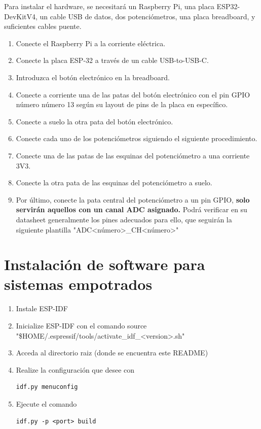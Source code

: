 \documentclass[12pt,a4paper,twoside,openright]{book}
\begin{document}
\begin{umaappendices}
Para instalar el hardware, se necesitará un Raspberry Pi, una placa ESP32-DevKitV4, un cable USB de datos, dos potenciómetros, una placa breadboard, y suficientes cables puente.
\begin{enumerate}
\item Conecte el Raspberry Pi a la corriente eléctrica.
\item Conecte la placa ESP-32 a través de un cable USB-to-USB-C.
\item Introduzca el botón electrónico en la breadboard.
\item Conecte a corriente una de las patas del botón electrónico con el pin GPIO número número 13 según su layout de pins de la placa en específico.
\item Conecte a suelo la otra pata del botón electrónico.
\item Conecte cada uno de los potenciómetros siguiendo el siguiente procedimiento.
\item[\textbullet] Conecte una de las patas de las esquinas del potenciómetro a una corriente 3V3.
\item[\textbullet] Conecte la otra pata de las esquinas del potenciómetro a suelo.
\item[\textbullet] Por último, conecte la pata central del potenciómetro a un pin GPIO, \textbf{solo servirán aquellos con un canal ADC asignado.} Podrá verificar en su datasheet generalmente los pines adecuados para ello, que seguirán la siguiente plantilla "ADC<número>\_CH<número>" 
\end{enumerate}

\section{Instalación de software para sistemas empotrados}

\begin{enumerate}
  \item Instale ESP-IDF
  \item Inicialize ESP-IDF con el comando source "\$HOME/.espressif/tools/activate\_idf\_<version>.sh" 
  \item Acceda al directorio raiz (donde se encuentra este README)
  \item Realize la configuración que desee con \begin{verbatim}idf.py menuconfig\end{verbatim}
  \item Ejecute el comando \begin{verbatim}idf.py -p <port> build\end{verbatim}
\end{enumerate}


\end{umaappendices}
\end{document}

